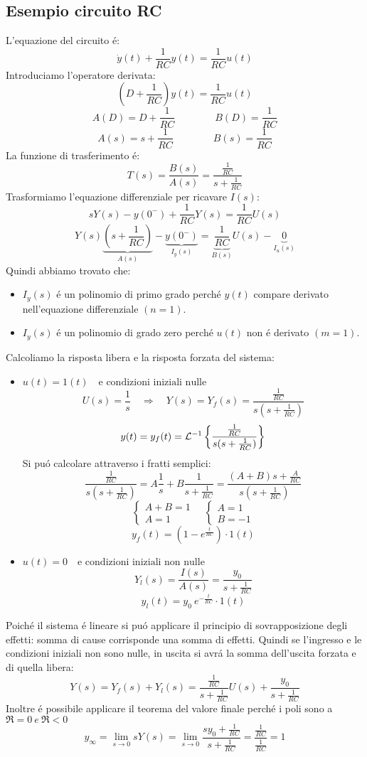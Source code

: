 \documentclass[../main.tex]{subfiles}
\begin{document}
	\subsection{Esempio circuito RC}
	L'equazione del circuito \'{e}:
	\[ \dot{y}(t) + \frac{1}{RC} y(t) = \frac{1}{RC} u(t)  \]
	Introduciamo l'operatore derivata:
	\[ (D + \frac{1}{RC}) y(t) = \frac{1}{RC} u(t) \]
	\[ A(D) = D + \frac{1}{RC} \qquad \qquad B(D) = \frac{1}{RC} \]
	\[ A(s) = s + \frac{1}{RC} \qquad \qquad B(s) = \frac{1}{RC} \]
	La funzione di trasferimento \'{e}:
	\[ T(s) = \frac{B(s)}{A(s)} = \frac{\frac{1}{RC}}{s+\frac{1}{RC}}\]
	Trasformiamo l'equazione differenziale per ricavare $ I(s) $:
	\[ s Y(s) - y(0^-) + \frac{1}{RC} Y(s) = \frac{1}{RC} U(s) \]
	\[ Y(s) \underbrace{ \left( s + \frac{1}{RC} \right) }_{A(s)} - \underbrace{y(0^-)}_{I_y(s)} = \underbrace{\frac{1}{RC}}_{B(s)} U(s) - \underbrace{0}_{I_u(s)} \]
	Quindi abbiamo trovato che:
	\begin{itemize}
		\item $ I_y(s) $ \'e un polinomio di primo grado perch\'e $ y(t) $ compare derivato nell'equazione differenziale $ (n = 1) $.
		\item $ I_y(s) $ \'e un polinomio di grado zero perch\'e $ u(t) $ non \'e derivato $ (m = 1) $. 
	\end{itemize}
	Calcoliamo la risposta libera e la risposta forzata del sistema:
	\begin{itemize}
		\item $ u(t) = 1(t) \quad \text{e condizioni iniziali nulle} $\\
		\[ U(s) = \frac{1}{s} \quad \Rightarrow \quad Y(s) = Y_f(s) = \frac{\frac{1}{RC}}{s(s+\frac{1}{RC})} \]
		\[ y(t) = y_f(t) = \mathcal{L}^{-1} \left\lbrace \frac{\frac{1}{RC}}{s(s+\frac{1}{RC})} \right\rbrace \]
		Si pu\'{o} calcolare attraverso i fratti semplici:
		\[ \frac{\frac{1}{RC}}{s(s+\frac{1}{RC})} = A\frac{1}{s} + B\frac{1}{s+\frac{1}{RC}} = \frac{(A+B)s+\frac{A}{RC}}{s(s+\frac{1}{RC})} \]
		\[ \begin{cases} A+B=1\\ A=1 \end{cases} \quad \begin{cases} A=1\\ B=-1 \end{cases} \]
		\[ y_f(t) = (1-e^{\frac{t}{RC}}) \cdot 1(t) \]
		\item $ u(t) = 0 \quad \text{e condizioni iniziali non nulle} $\\
		\[ Y_l(s) = \frac{I(s)}{A(s)} = \frac{y_0}{s+\frac{1}{RC}} \]
		\[ y_l(t) = y_0\ e^{-\frac{t}{RC}} \cdot 1(t) \]
	\end{itemize}
	\medskip
	Poich\'{e} il sistema \'{e} lineare si pu\'{o} applicare il principio di sovrapposizione degli effetti: somma di cause corrisponde una somma di effetti. Quindi se l'ingresso e le condizioni iniziali non sono nulle, in uscita si avr\'{a} la somma dell'uscita forzata e di quella libera:
	\[ Y(s) = Y_f(s) + Y_l(s) = \frac{\frac{1}{RC}}{s+\frac{1}{RC}}U(s) + \frac{y_0}{s+\frac{1}{RC}} \]
	Inoltre \'{e} possibile applicare il teorema del valore finale perch\'{e} i poli sono a $ \Re = 0\ e\ \Re < 0 $
	\[ y_\infty = \lim\limits_{s \rightarrow 0} sY(s) = \lim\limits_{s \rightarrow 0} \frac{sy_0+\frac{1}{RC}}{s+\frac{1}{RC}} = \frac{\frac{1}{RC}}{\frac{1}{RC}} = 1 \]
\end{document}
